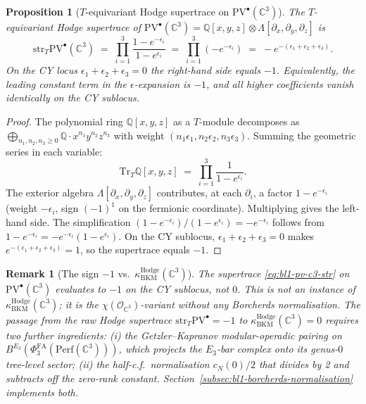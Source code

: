 \documentclass[11pt]{article}
\newtheorem{proposition}[theorem]{Proposition}
\newtheorem{remark}[theorem]{Remark}
\providecommand{\Perf}{\mathrm{Perf}}
\providecommand{\PV}{\mathrm{PV}}
\providecommand{\PVbullet}{\mathrm{PV}^{\bullet}}
\providecommand{\cO}{\mathcal{O}}
\providecommand{\C}{\mathbb{C}}
\providecommand{\Q}{\mathbb{Q}}
\providecommand{\kBKM}{\kappa_{\mathrm{BKM}}}
\providecommand{\str}{\mathrm{str}}
\providecommand{\Tr}{\mathrm{Tr}}
\providecommand{\PhiFA}{\Phi^{\mathrm{FA}}}
\begin{document}
\begin{proposition}[$T$-equivariant Hodge supertrace on $\PV^\bullet(\C^3)$]
\label{prop:bl1-t-str-pv-c3}
The $T$-equivariant Hodge supertrace of
$\PV^\bullet(\C^3) = \Q[x,y,z] \otimes \Lambda[\partial_x, \partial_y,
\partial_z]$ is
\begin{equation}
\label{eq:bl1-pv-c3-str}
  \str_T \PV^\bullet(\C^3)
  \;=\;
  \prod_{i=1}^{3} \frac{1 - e^{-\epsilon_i}}{1 - e^{\epsilon_i}}
  \;=\;
  \prod_{i=1}^{3} (-e^{-\epsilon_i})
  \;=\;
  -e^{-(\epsilon_1 + \epsilon_2 + \epsilon_3)}.
\end{equation}
On the CY locus $\epsilon_1 + \epsilon_2 + \epsilon_3 = 0$ the right-hand
side equals $-1$. Equivalently, the leading constant term in the
$\epsilon$-expansion is $-1$, and all higher coefficients vanish
identically on the CY sublocus.
\end{proposition}

\begin{proof}
The polynomial ring $\Q[x,y,z]$ as a $T$-module decomposes as
$\bigoplus_{n_1, n_2, n_3 \geq 0} \Q \cdot x^{n_1} y^{n_2} z^{n_3}$ with
weight $(n_1 \epsilon_1, n_2 \epsilon_2, n_3 \epsilon_3)$. Summing the
geometric series in each variable:
\begin{equation}
  \Tr_T \Q[x,y,z]
  \;=\; \prod_{i=1}^{3} \frac{1}{1 - e^{\epsilon_i}}.
\end{equation}
The exterior algebra $\Lambda[\partial_x, \partial_y, \partial_z]$
contributes, at each $\partial_i$, a factor $1 - e^{-\epsilon_i}$
(weight $-\epsilon_i$, sign $(-1)^1$ on the fermionic coordinate).
Multiplying gives the left-hand side. The simplification
$(1 - e^{-\epsilon_i})/(1 - e^{\epsilon_i}) = -e^{-\epsilon_i}$ follows
from $1 - e^{-\epsilon_i} = -e^{-\epsilon_i}(1 - e^{\epsilon_i})$.
On the CY sublocus, $\epsilon_1 + \epsilon_2 + \epsilon_3 = 0$ makes
$e^{-(\epsilon_1+\epsilon_2+\epsilon_3)} = 1$, so the supertrace equals
$-1$.
\end{proof}

\begin{remark}[The sign $-1$ vs.\ $\kBKM^{\mathrm{Hodge}}(\C^3)$]
\label{rem:bl1-sign-discipline}
The supertrace \eqref{eq:bl1-pv-c3-str} on $\PVbullet(\C^3)$ evaluates
to $-1$ on the CY sublocus, not $0$. This is \emph{not} an instance of
$\kBKM^{\mathrm{Hodge}}(\C^3)$; it is the $\chi(\cO_{\C^3})$-variant
without any Borcherds normalisation. The passage from the raw Hodge
supertrace $\str_T \PVbullet = -1$ to
$\kBKM^{\mathrm{Hodge}}(\C^3) = 0$ requires two further ingredients:
(i) the Getzler--Kapranov modular-operadic pairing on
$B^{E_3}(\PhiFA_3(\Perf(\C^3)))$, which projects the $E_3$-bar complex
onto its genus-$0$ tree-level sector; (ii) the half-c.f.\
normalisation $c_N(0)/2$ that divides by 2 and subtracts off the
zero-rank constant. Section~\ref{subsec:bl1-borcherds-normalisation}
implements both.
\end{remark}
\end{document}
